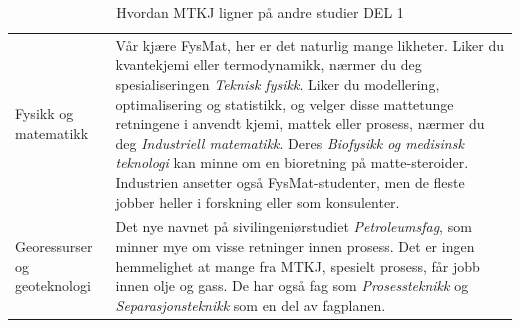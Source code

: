 \begin{table}[H]
\begin{tabular}{p{3cm}p{10cm}}
        Fysikk og matematikk & Vår kjære FysMat, her er det naturlig mange likheter. Liker du kvantekjemi eller termodynamikk, nærmer du deg spesialiseringen \textit{Teknisk fysikk}. Liker du modellering, optimalisering og statistikk, og velger disse mattetunge retningene i anvendt kjemi, mattek eller prosess, nærmer du deg \textit{Industriell matematikk}. Deres \textit{Biofysikk og medisinsk teknologi} kan minne om en bioretning på matte-steroider. Industrien ansetter også FysMat-studenter, men de fleste jobber heller i forskning eller som konsulenter. \\
        
        Georessurser og geoteknologi & Det nye navnet på sivilingeniørstudiet \textit{Petroleumsfag}, som minner mye om visse retninger innen prosess. Det er ingen hemmelighet at mange fra MTKJ, spesielt prosess, får jobb innen olje og gass. De har også fag som \textit{Prosessteknikk} og \textit{Separasjonsteknikk} som en del av fagplanen. \\
        \bottomrule
    \end{tabular}
    \caption{Hvordan MTKJ ligner på andre studier DEL 1}
    \label{tab:AndreStudierDel1}
\end{table}

\newpage


